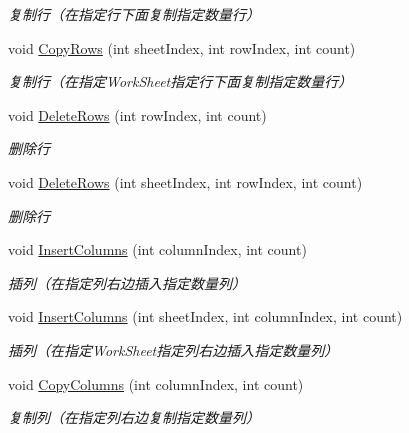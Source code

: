 \begin{DoxyCompactItemize}
\begin{DoxyCompactList}\small\item\em 复制行（在指定行下面复制指定数量行） \end{DoxyCompactList}\item 
void \hyperlink{class_x_c_l_net_tools_1_1_data_handler_1_1_excel_helper_a40281cf4653e2a362aa4e897001ff001}{Copy\-Rows} (int sheet\-Index, int row\-Index, int count)
\begin{DoxyCompactList}\small\item\em 复制行（在指定\-Work\-Sheet指定行下面复制指定数量行） \end{DoxyCompactList}\item 
void \hyperlink{class_x_c_l_net_tools_1_1_data_handler_1_1_excel_helper_a998f8178efe9f0602f1e3d30e9096eb8}{Delete\-Rows} (int row\-Index, int count)
\begin{DoxyCompactList}\small\item\em 删除行 \end{DoxyCompactList}\item 
void \hyperlink{class_x_c_l_net_tools_1_1_data_handler_1_1_excel_helper_aaac48849297e93e10a6ccd8dd30cdd64}{Delete\-Rows} (int sheet\-Index, int row\-Index, int count)
\begin{DoxyCompactList}\small\item\em 删除行 \end{DoxyCompactList}\item 
void \hyperlink{class_x_c_l_net_tools_1_1_data_handler_1_1_excel_helper_a950e53c43178294b31ad227251f5dfcb}{Insert\-Columns} (int column\-Index, int count)
\begin{DoxyCompactList}\small\item\em 插列（在指定列右边插入指定数量列） \end{DoxyCompactList}\item 
void \hyperlink{class_x_c_l_net_tools_1_1_data_handler_1_1_excel_helper_ad5b4582fcf63403a838d9c0b9acd9ee4}{Insert\-Columns} (int sheet\-Index, int column\-Index, int count)
\begin{DoxyCompactList}\small\item\em 插列（在指定\-Work\-Sheet指定列右边插入指定数量列） \end{DoxyCompactList}\item 
void \hyperlink{class_x_c_l_net_tools_1_1_data_handler_1_1_excel_helper_a477309c8e46fd02109a7ee4a8164221d}{Copy\-Columns} (int column\-Index, int count)
\begin{DoxyCompactList}\small\item\em 复制列（在指定列右边复制指定数量列） \end{DoxyCompactList}\item 

\end{DoxyCompactItemize}
